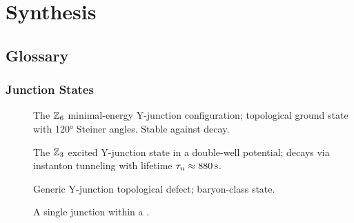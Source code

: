 \documentclass[11pt,a4paper,twoside,openright]{book}
\begin{document}





\part{Synthesis}
\label{part:synthesis}





\backmatter


\appendix















\chapter{Glossary}
\label{app:glossary}


\section*{Junction States}
\begin{description}
    \item[\AnchorJunction] The $\mathbb{Z}_6$ minimal-energy Y-junction configuration;
        topological ground state with 120° Steiner angles. Stable against decay.
    \item[\MetastableJunction] The $\mathbb{Z}_3$ excited Y-junction state in a
        double-well potential; decays via instanton tunneling with lifetime
        $\tau_n \approx 880\,\mathrm{s}$.
    \item[\Junction] Generic Y-junction topological defect; baryon-class state.
    \item[\Constituent] A single junction within a \ClusterState.
\end{description}
\end{document}
